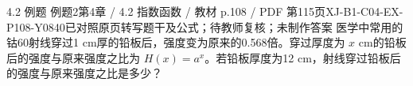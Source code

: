 \par\noindent\begin{minipage}{\linewidth}
\begin{bankitem}{4.2 例题 例题2}{第4章 / 4.2 指数函数 / 教材 p.108 / PDF 第115页}{XJ-B1-C04-EX-P108-Y0840}{已对照原页转写题干及公式；待教师复核；未制作答案}
医学中常用的钴60射线穿过1 cm厚的铅板后，强度变为原来的0.568倍。穿过厚度为 $x$ cm的铅板后的强度与原来强度之比为 $H(x)=a^x$。若铅板厚度为12 cm，射线穿过铅板后的强度与原来强度之比是多少？
\end{bankitem}
\end{minipage}\par\medskip

